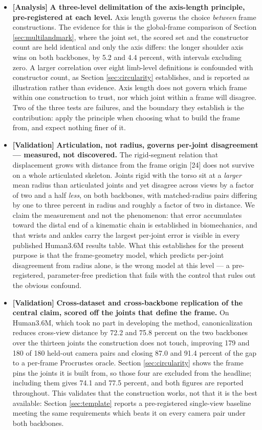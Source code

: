 \documentclass[12pt,a4paper]{report}
\begin{document}
\begin{itemize}
\item \textbf{[Analysis]} \textbf{A three-level delimitation of the axis-length principle, pre-registered at each level.} Axis length governs the choice \emph{between} frame constructions. The evidence for this is the global-frame comparison of Section \ref{sec:multilandmark}, where the joint set, the scored set and the constructor count are held identical and only the axis differs: the longer shoulder axis wins on both backbones, by 5.2 and 4.4 percent, with intervals excluding zero. A larger correlation over eight limb-level definitions is confounded with constructor count, as Section \ref{sec:circularity} establishes, and is reported as illustration rather than evidence. Axis length does not govern which frame within one construction to trust, nor which joint within a frame will disagree. Two of the three tests are failures, and the boundary they establish is the contribution: apply the principle when choosing what to build the frame from, and expect nothing finer of it.

\item \textbf{[Validation]} \textbf{Articulation, not radius, governs per-joint disagreement --- measured, not discovered.} The rigid-segment relation that displacement grows with distance from the frame origin [24] does not survive on a whole articulated skeleton. Joints rigid with the torso sit at a \emph{larger} mean radius than articulated joints and yet disagree across views by a factor of two and a half \emph{less}, on both backbones, with matched-radius pairs differing by one to three percent in radius and roughly a factor of two in distance. We claim the measurement and not the phenomenon: that error accumulates toward the distal end of a kinematic chain is established in biomechanics, and that wrists and ankles carry the largest per-joint error is visible in every published Human3.6M results table. What this establishes for the present purpose is that the frame-geometry model, which predicts per-joint disagreement from radius alone, is the wrong model at this level --- a pre-registered, parameter-free prediction that fails with the control that rules out the obvious confound.

\item \textbf{[Validation]} \textbf{Cross-dataset and cross-backbone replication of the central claim, scored off the joints that define the frame.} On Human3.6M, which took no part in developing the method, canonicalization reduces cross-view distance by 72.2 and 75.8 percent on the two backbones over the thirteen joints the construction does not touch, improving 179 and 180 of 180 held-out camera pairs and closing 87.0 and 91.4 percent of the gap to a per-frame Procrustes oracle. Section \ref{sec:circularity} shows the frame pins the joints it is built from, so those four are excluded from the headline; including them gives 74.1 and 77.5 percent, and both figures are reported throughout. This validates that the construction works, not that it is the best available: Section \ref{sec:template} reports a pre-registered single-view baseline meeting the same requirements which beats it on every camera pair under both backbones.


\end{itemize}
\end{document}
